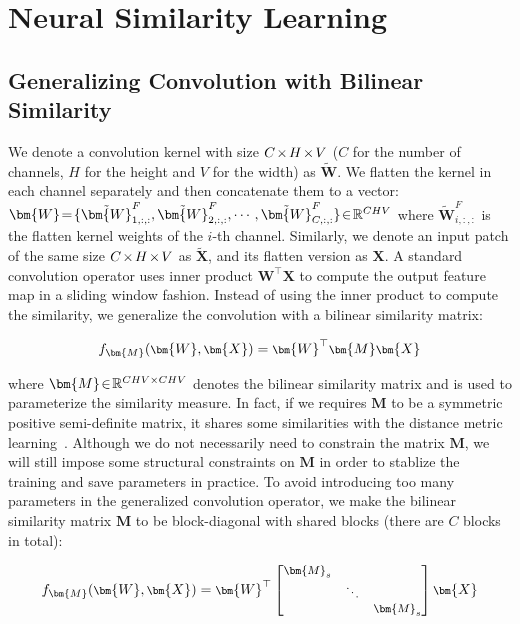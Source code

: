 \section{Neural Similarity Learning}

\subsection{Generalizing Convolution with Bilinear Similarity}

We denote a convolution kernel with size $\thickmuskip=2mu \medmuskip=2mu C\times H\times V$ ($C$ for the number of channels, $H$ for the height and $V$ for the width) as $\tilde{\bm{W}}$. We flatten the kernel in each channel separately and then concatenate them to a vector: $\thickmuskip=2mu \medmuskip=2mu \bm{W}=\{\tilde{\bm{W}}^F_{1,:,:},\tilde{\bm{W}}^F_{2,:,:},\cdots,\tilde{\bm{W}}^F_{C,:,:}\}\in\mathbb{R}^{CHV}$ where $\tilde{\bm{W}}^F_{i,:,:}$ is the flatten kernel weights of the $i$-th channel. Similarly, we denote an input patch of the same size $\thickmuskip=2mu \medmuskip=2mu C\times H\times V$ as $\tilde{\bm{X}}$, and its flatten version as $\bm{X}$. A standard convolution operator uses inner product $\bm{W}^\top\bm{X}$ to compute the output feature map in a sliding window fashion. Instead of using the inner product to compute the similarity, we generalize the convolution with a bilinear similarity matrix:

\begin{equation}\label{eq1}
\footnotesize
    f_{\bm{M}}(\bm{W},\bm{X}) = \bm{W}^\top\bm{M} \bm{X}
\end{equation}

where $\thickmuskip=2mu \medmuskip=2mu\bm{M}\in \mathbb{R}^{CHV\times CHV}$ denotes the bilinear similarity matrix and is used to parameterize the similarity measure. In fact, if we requires $\bm{M}$ to be a symmetric positive semi-definite matrix, it shares some similarities with the distance metric learning~\cite{xing2003distance}. Although we do not necessarily need to constrain the matrix $\bm{M}$, we will still impose some structural constraints on $\bm{M}$ in order to stablize the training and save parameters in practice. To avoid introducing too many parameters in the generalized convolution operator, we make the bilinear similarity matrix $\bm{M}$ to be block-diagonal with shared blocks (there are $C$ blocks in total):

\begin{equation}
\footnotesize
    f_{\bm{M}}(\bm{W},\bm{X}) =\bm{W}^\top \begin{bmatrix}
    \bm{M}_s & & \\
    & \ddots & \\
    & & \bm{M}_s
  \end{bmatrix} \bm{X}
\end{equation}

